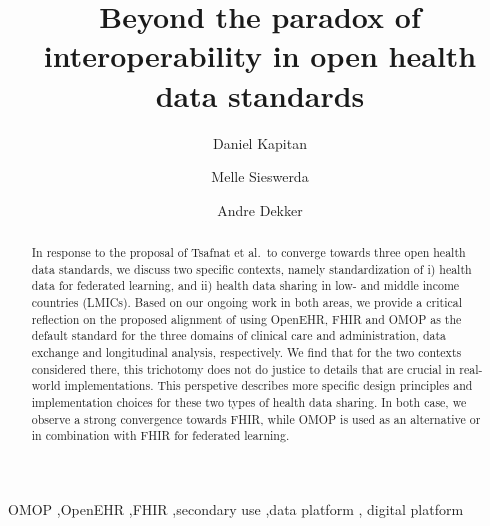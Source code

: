 \documentclass[
  authoryear]{elsarticle}
\begin{document}
\begin{frontmatter}
\title{Beyond the paradox of interoperability in open health data
standards}
\author[1,2,3]{Daniel Kapitan%
%
}
\author[4,5]{Melle Sieswerda%
%
}

\author[5]{Andre Dekker%
%
}






        
\begin{abstract}
In response to the proposal of Tsafnat et al.~to converge towards three
open health data standards, we discuss two specific contexts, namely
standardization of i) health data for federated learning, and ii) health
data sharing in low- and middle income countries (LMICs). Based on our
ongoing work in both areas, we provide a critical reflection on the
proposed alignment of using OpenEHR, FHIR and OMOP as the default
standard for the three domains of clinical care and administration, data
exchange and longitudinal analysis, respectively. We find that for the
two contexts considered there, this trichotomy does not do justice to
details that are crucial in real-world implementations. This perspetive
describes more specific design principles and implementation choices for
these two types of health data sharing. In both case, we observe a
strong convergence towards FHIR, while OMOP is used as an alternative or
in combination with FHIR for federated learning.
\end{abstract}





\begin{keyword}
    OMOP \sep OpenEHR \sep FHIR \sep secondary use \sep data
platform \sep 
    digital platform
\end{keyword}
\end{frontmatter}
    
\end{document}
